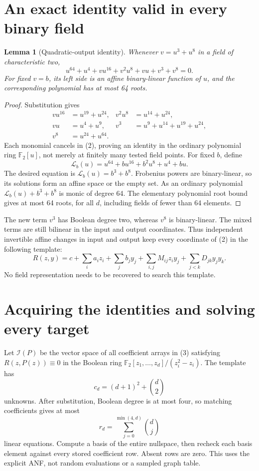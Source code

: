 \documentclass[11pt]{article}
\newtheorem{lemma}[theorem]{Lemma}
\newcommand{\F}{\mathbb F_2}
\begin{document}
\section{An exact identity valid in every binary field}
\begin{lemma}[Quadratic-output identity]\label{lem:id}
Whenever $v=u^3+u^8$ in a field of characteristic two,
\[
 u^{64}+u^4+vu^{16}+v^2u^8+vu+v^3+v^8=0.               \tag{2}
\]
For fixed $v=b$, its left side is an affine binary-linear function of $u$,
and the corresponding polynomial has at most 64 roots.
\end{lemma}
\begin{proof}
Substitution gives
\begin{align*}
vu^{16}&=u^{19}+u^{24}, &v^2u^8&=u^{14}+u^{24},\\
vu&=u^4+u^9, &v^3&=u^9+u^{14}+u^{19}+u^{24},\\
v^8&=u^{24}+u^{64}.
\end{align*}
Each monomial cancels in (2), proving an identity in the ordinary polynomial
ring $\F[u]$, not merely at finitely many tested field points.
For fixed $b$, define
\[
 \mathcal L_b(u)=u^{64}+bu^{16}+b^2u^8+u^4+bu.
\]
The desired equation is $\mathcal L_b(u)=b^3+b^8$. Frobenius powers are
binary-linear, so its solutions form an affine space or the empty set.
As an ordinary polynomial $\mathcal L_b(u)+b^3+b^8$ is monic of degree 64.
The elementary polynomial root bound gives at most 64 roots, for all $d$,
including fields of fewer than 64 elements.
\end{proof}

The new term $v^3$ has Boolean degree two, whereas $v^8$ is binary-linear.
The mixed terms are still bilinear in the input and output coordinates.
Thus independent invertible affine changes in input and output keep every
coordinate of (2) in the following template:
\[
 R(z,y)=c+\sum_i a_i z_i+\sum_j b_j y_j+
 \sum_{i,j}M_{ij}z_i y_j+\sum_{j<k}D_{jk}y_jy_k.         \tag{3}
\]
No field representation needs to be recovered to search this template.

\section{Acquiring the identities and solving every target}
Let $\mathcal I(P)$ be the vector space of all coefficient arrays in (3)
satisfying $R(z,P(z))\equiv0$ in the Boolean ring
$\F[z_1,\ldots,z_d]/(z_i^2-z_i)$. The template has
\[
 c_d=(d+1)^2+\binom d2                                  \tag{4}
\]
unknowns. After substitution, Boolean degree is at most four, so matching
coefficients gives at most
\[
 r_d=\sum_{j=0}^{\min(4,d)}\binom dj                    \tag{5}
\]
linear equations. Compute a basis of the entire nullspace, then recheck each
basis element against every stored coefficient row. Absent rows are zero.
This uses the explicit ANF, not random evaluations or a sampled graph table.
\end{document}
